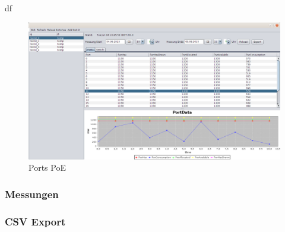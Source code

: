 df

\begin{figure}[h]
    \centering
    \leavevmode
    \includegraphics[width=1.0\linewidth]{figures/screenshot1.png}
    \caption{Ports PoE}
    \label{fig:Ports-PoE}
\end{figure}

\subsubsection{Messungen}

\subsubsection{CSV Export}
